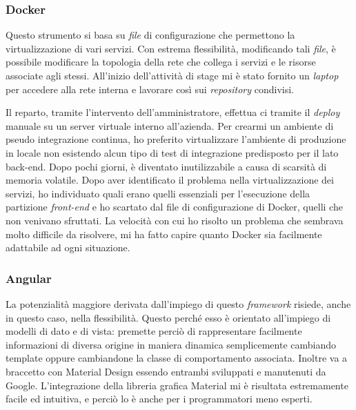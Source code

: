 \subsubsection{Docker}
\label{ssec:docker}
Questo strumento si basa su \textit{file} di configurazione che permettono la virtualizzazione di vari servizi. Con estrema flessibilità, modificando tali \textit{file}, è possibile modificare la topologia della rete che collega i servizi e le risorse associate agli stessi. All'inizio dell'attività di stage mi è stato fornito un \textit{laptop} per accedere alla rete interna e lavorare così sui \textit{repository} condivisi.

Il reparto, tramite l'intervento dell'amministratore, effettua \acrshort{ci} tramite il \textit{deploy} manuale su un server virtuale interno all'azienda. Per crearmi un ambiente di pseudo integrazione continua, ho preferito virtualizzare l'ambiente di produzione in locale non esistendo alcun tipo di test di integrazione predisposto per il lato back-end. Dopo pochi giorni, è diventato inutilizzabile a causa di scarsità di memoria volatile. Dopo aver identificato il problema nella virtualizzazione dei servizi, ho individuato quali erano quelli essenziali per l'esecuzione della partizione \textit{front-end} e ho scartato dal file di configurazione di Docker, quelli che non venivano sfruttati.
La velocità con cui ho risolto un problema che sembrava molto difficile da risolvere, mi ha fatto capire quanto Docker sia facilmente adattabile ad ogni situazione.
\newpage
\subsubsection{Angular}
La potenzialità maggiore derivata dall'impiego di questo \textit{framework} risiede, anche in questo caso, nella flessibilità. Questo perché esso è orientato all'impiego di modelli di dato e di vista: premette perciò di rappresentare facilmente informazioni di diversa origine in maniera dinamica semplicemente cambiando template oppure cambiandone la classe di comportamento associata.
Inoltre va a braccetto con Material Design essendo entrambi sviluppati e manutenuti da Google. L'integrazione della libreria grafica Material mi è risultata estremamente facile ed intuitiva, e perciò lo è anche per i programmatori meno esperti.

